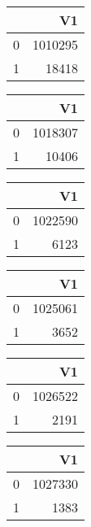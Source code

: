\bigskip\bigskip
\centering
\begin{tabular}{rr}
  \hline
 & V1 \\ 
  \hline
0 & 1010295 \\ 
  1 & 18418 \\ 
   \hline
\end{tabular}

\bigskip\bigskip
\centering
\begin{tabular}{rr}
  \hline
 & V1 \\ 
  \hline
0 & 1018307 \\ 
  1 & 10406 \\ 
   \hline
\end{tabular}

\bigskip\bigskip
\centering
\begin{tabular}{rr}
  \hline
 & V1 \\ 
  \hline
0 & 1022590 \\ 
  1 & 6123 \\ 
   \hline
\end{tabular}

\bigskip\bigskip
\centering
\begin{tabular}{rr}
  \hline
 & V1 \\ 
  \hline
0 & 1025061 \\ 
  1 & 3652 \\ 
   \hline
\end{tabular}

\bigskip\bigskip
\centering
\begin{tabular}{rr}
  \hline
 & V1 \\ 
  \hline
0 & 1026522 \\ 
  1 & 2191 \\ 
   \hline
\end{tabular}

\bigskip\bigskip
\centering
\begin{tabular}{rr}
  \hline
 & V1 \\ 
  \hline
0 & 1027330 \\ 
  1 & 1383 \\ 
   \hline
\end{tabular}

